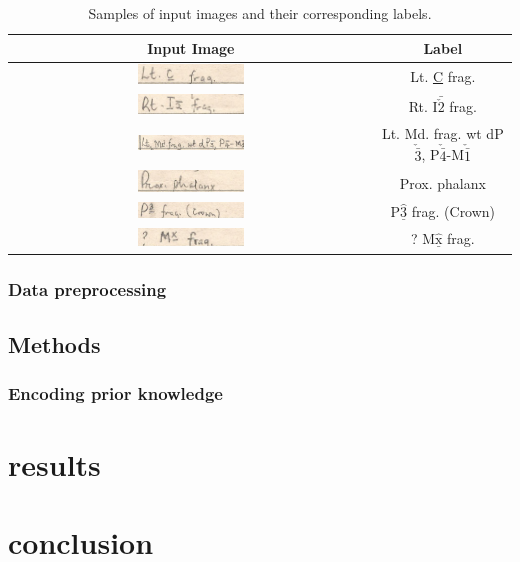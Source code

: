 \documentclass{article}
\begin{document}
\begin{table}[h!]
    \centering
    \begin{tabular}{|c|c|}
        \hline
        \textbf{Input Image} & \textbf{Label} \\
        \hline
        \includegraphics[width=0.3\textwidth]{../images/data_samples/canine.png} & Lt. \underline{C} frag. \\
        \hline
        \includegraphics[width=0.3\textwidth]{../images/data_samples/lowjawincisor.png} & Rt. I$\bar{\check{2}}$ frag. \\
        \hline
        \includegraphics[width=0.3\textwidth]{../images/data_samples/multipleteeth.png} & Lt. Md. frag. wt dP$\check{\bar{3}}$, P$\check{\bar{4}}$-M$\check{\bar{1}}$\\
        \hline
        \includegraphics[width=0.3\textwidth]{../images/data_samples/nontooth.png} & Prox. phalanx \\
        \hline
        \includegraphics[width=0.3\textwidth]{../images/data_samples/smudged.png} & P$\hat{\underline{\text{3}}}$ frag. (Crown) \\
        \hline
        \includegraphics[width=0.3\textwidth]{../images/data_samples/underlinedx.png} & ? M$\hat{\underline{\text{x}}}$ frag. \\
        \hline
    \end{tabular}
    \caption{Samples of input images and their corresponding labels.}
    \label{table:input_images}
\end{table}

\subsubsection{Data preprocessing}

\subsection{Methods}

\subsubsection{Encoding prior knowledge}

\section{results}

\section{conclusion}

\printbibliography
\end{document}
